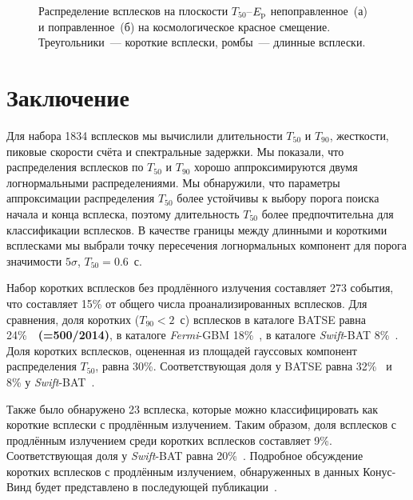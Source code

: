\begin{figure}[h]
  \begin{minipage}[h]{0.5\textwidth}
  \end{minipage}
  \hfill
  \begin{minipage}[h]{0.5\textwidth}
  \end{minipage}
  \caption{Распределение всплесков на плоскости $T_{50}$--$E_{{\mathrm{p}}}$ непоправленное~(а) 
  и поправленное~(б) на космологическое красное смещение. 
  Треугольники~--- короткие всплески, ромбы~--- длинные всплески.}
  \label{img:T50EpzCorr}  
\end{figure}
\clearpage

\section{Заключение} \label{sec:Conclision}
Для набора 1834 всплесков мы вычислили длительности $T_{50}$ и $T_{90}$, жесткости, 
пиковые скорости счёта и спектральные задержки. Мы показали, что распределения 
всплесков по $T_{50}$ и $T_{90}$ хорошо аппроксимируются двумя логнормальными 
распределениями. Мы обнаружили, что параметры аппроксимации распределения $T_{50}$ 
более устойчивы к выбору порога поиска начала и конца всплеска, поэтому длительность 
$T_{50}$ более предпочтительна для классификации всплесков. В качестве границы между 
длинными и короткими всплесками мы выбрали точку пересечения логнормальных компонент 
для порога значимости $5\sigma$, $T_{50} = 0.6$~с. 

Набор коротких всплесков без продлённого излучения составляет 273 события, 
что составляет 15\% от общего числа проанализированных всплесков. Для сравнения, 
доля коротких ($T_{90}<2$~с) всплесков в каталоге BATSE равна 24\%~\citep{Meegan_2001}~\textbf{(=500/2014)}, 
в каталоге \textit{Fermi}-GBM 18\%~\citep{Paciesas_2012}, 
в каталоге \textit{Swift}-BAT 8\%~\citep{Sakamoto_2011_2nd_BAT_catalog}. 
Доля коротких всплесков, оцененная из площадей гауссовых компонент 
распределения $T_{50}$, равна 30\%. Соответствующая доля у BATSE равна 32\%~\citep{Horvath_2002} 
и 8\% у \textit{Swift}-BAT~\citep{Horvath_2008}.  

Также было обнаружено 23 всплеска, которые можно классифицировать как короткие 
всплески с продлённым излучением. Таким образом, доля всплесков с продлённым 
излучением среди коротких всплесков составляет 9\%. Соответствующая доля 
у \textit{Swift}-BAT равна 20\%~\citep{Sakamoto_2011_2nd_BAT_catalog}. 
Подробное обсуждение коротких всплесков с продлённым излучением, обнаруженных 
в данных Конус-Винд будет представлено в последующей публикации~\citep{Svinkin_sGRB_EE}.

